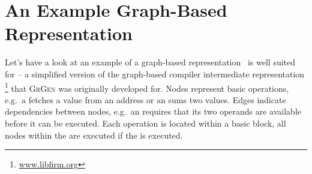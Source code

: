\section{An Example Graph-Based Representation}\label{sub:examplegraphrep}
Let's have a look at an example of a graph-based representation \GrG\ is well suited for 
-- a simplified version of the graph-based compiler intermediate representation \Firm\footnote{\url{www.libfirm.org}} that \textsc{GrGen} was originally developed for.
Nodes represent basic operations, e.g.\ a  fetches a value from an address or an  sums two values.
Edges indicate dependencies between nodes, e.g.\ an  requires that its two operands are available before it can be executed.
Each operation is located within a basic block,
all nodes within the  are executed if the  is executed.

